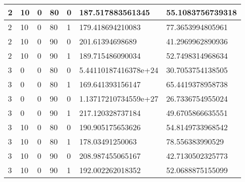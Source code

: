 \documentclass{article}
\theoremstyle{definition}
\begin{document}
\begin{table}[]
\begin{tabular}{|l|l|l|l|l|l|l|}
2                & 10                 & 0                 & 80              & 0               & 187.517883561345     & 55.1083756739318 \\ \hline
2                & 10                 & 0                 & 80              & 1               & 179.418694210083     & 77.3653994805961 \\ \hline
2                & 10                 & 0                 & 90              & 0               & 201.61394698689      & 41.2969962890936 \\ \hline
2                & 10                 & 0                 & 90              & 1               & 189.715486090034     & 52.7498314968634 \\ \hline
3                & 0                  & 0                 & 80              & 0               & 5.44110187416378e+24 & 30.7053754138505 \\ \hline
3                & 0                  & 0                 & 80              & 1               & 169.641393156147     & 65.4419378958738 \\ \hline
3                & 0                  & 0                 & 90              & 0               & 1.13717210734559e+27 & 26.7336754955024 \\ \hline
3                & 0                  & 0                 & 90              & 1               & 217.120328737184     & 49.6705866635551 \\ \hline
3                & 10                 & 0                 & 80              & 0               & 190.905175653626     & 54.8149733968542 \\ \hline
3                & 10                 & 0                 & 80              & 1               & 178.03491250063      & 78.556383990529  \\ \hline
3                & 10                 & 0                 & 90              & 0               & 208.987455065167     & 42.7130502325773 \\ \hline
3                & 10                 & 0                 & 90              & 1               & 192.002262018352     & 52.0688875155099 \\ \hline
\end{tabular}
\end{table}
\end{document}
